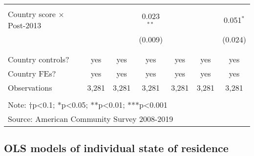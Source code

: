 \documentclass[
  11pt,
]{article}
\begin{document}
\begin{table}[!htbp]
\begin{tabular}{@{\extracolsep{5pt}}lcccccc}
  & & & & & & \\ 
 Country score × Post-2013 &  &  & 0.023$^{**}$ &  &  & 0.051$^{*}$ \\ 
  &  &  & (0.009) &  &  & (0.024) \\ 
  & & & & & & \\ 
\hline \\[-1.8ex] 
Country controls? & yes & yes & yes & yes & yes & yes \\ 
Country FEs? & yes & yes & yes & yes & yes & yes \\ 
Observations & 3,281 & 3,281 & 3,281 & 3,281 & 3,281 & 3,281 \\ 
\hline 
\hline \\[-1.8ex] 
\multicolumn{7}{l}{Note: †p<0.1; *p<0.05; **p<0.01; ***p<0.001} \\ 
\multicolumn{7}{l}{Source: American Community Survey 2008-2019} \\ 
\end{tabular} 
\end{table}

\newpage

\hypertarget{ols-models-of-individual-state-of-residence}{%
\subsection{OLS models of individual state of residence}\label{ols-models-of-individual-state-of-residence}}
\end{document}
